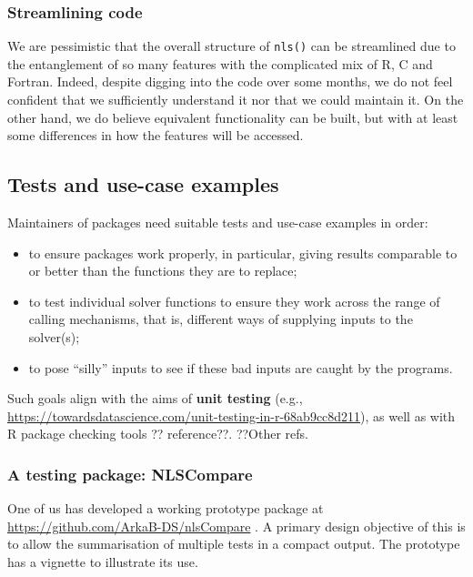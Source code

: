 \documentclass[
]{article}
\providecommand{\tightlist}{%
  \setlength{\itemsep}{0pt}\setlength{\parskip}{0pt}}
\begin{document}
\hypertarget{streamlining-code}{%
\subsubsection{Streamlining code}\label{streamlining-code}}

We are pessimistic that the overall structure of \texttt{nls()} can be
streamlined due to the entanglement of so many features with the
complicated mix of R, C and Fortran. Indeed, despite digging into the
code over some months, we do not feel confident that we sufficiently
understand it nor that we could maintain it. On the other hand, we do
believe equivalent functionality can be built, but with at least some
differences in how the features will be accessed.

\hypertarget{tests-and-use-case-examples}{%
\subsection{Tests and use-case
examples}\label{tests-and-use-case-examples}}

Maintainers of packages need suitable tests and use-case examples in
order:

\begin{itemize}
\tightlist
\item
  to ensure packages work properly, in particular, giving results
  comparable to or better than the functions they are to replace;
\item
  to test individual solver functions to ensure they work across the
  range of calling mechanisms, that is, different ways of supplying
  inputs to the solver(s);
\item
  to pose ``silly'' inputs to see if these bad inputs are caught by the
  programs.
\end{itemize}

Such goals align with the aims of \textbf{unit testing} (e.g.,
\url{https://towardsdatascience.com/unit-testing-in-r-68ab9cc8d211}), as
well as with R package checking tools ?? reference??. ??Other refs.

\hypertarget{a-testing-package-nlscompare}{%
\subsubsection{A testing package:
NLSCompare}\label{a-testing-package-nlscompare}}

One of us has developed a working prototype package at
\url{https://github.com/ArkaB-DS/nlsCompare} . A primary design
objective of this is to allow the summarisation of multiple tests in a
compact output. The prototype has a vignette to illustrate its use.
\end{document}
